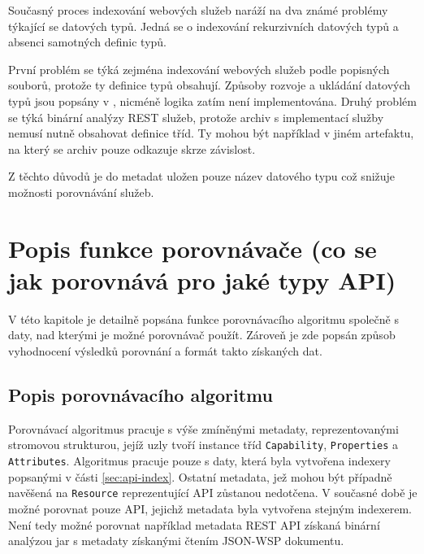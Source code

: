 \documentclass[czech,DP]{thesiskiv}
\begin{document}
Současný proces indexování webových služeb naráží na dva známé problémy týkající se datových typů. Jedná se o indexování rekurzivních datových typů a absenci samotných definic typů.

První problém se týká zejména indexování webových služeb podle popisných souborů, protože ty definice typů obsahují. Způsoby rozvoje a ukládání datových typů jsou popsány v \cite{abadi1995subytping}, nicméně logika zatím není implementována. Druhý problém se týká binární analýzy REST služeb, protože archiv s implementací služby nemusí nutně obsahovat definice tříd. Ty mohou být například v jiném artefaktu, na který se archiv pouze odkazuje skrze závislost.

Z těchto důvodů je do metadat uložen pouze název datového typu což snižuje možnosti porovnávání služeb.


\chapter{Popis funkce porovnávače (co se jak porovnává pro jaké typy API)}

V této kapitole je detailně popsána funkce porovnávacího algoritmu společně s daty, nad kterými je možné porovnávač použít. Zároveň je zde popsán způsob vyhodnocení výsledků porovnání a formát takto získaných dat.

\section{Popis porovnávacího algoritmu}

Porovnávací algoritmus pracuje s výše zmíněnými metadaty, reprezentovanými stromovou strukturou, jejíž uzly tvoří instance tříd \verb|Capability|, \verb|Properties| a \verb|Attributes|. Algoritmus pracuje pouze s daty, která byla vytvořena indexery popsanými v části \ref{sec:api-index}. Ostatní metadata, jež mohou být případně navěšená na \verb|Resource| reprezentující API zůstanou nedotčena. V současné době je možné porovnat pouze API, jejichž metadata byla vytvořena stejným indexerem. Není tedy možné porovnat například metadata REST API získaná binární analýzou jar s metadaty získanými čtením JSON-WSP dokumentu.
\end{document}
